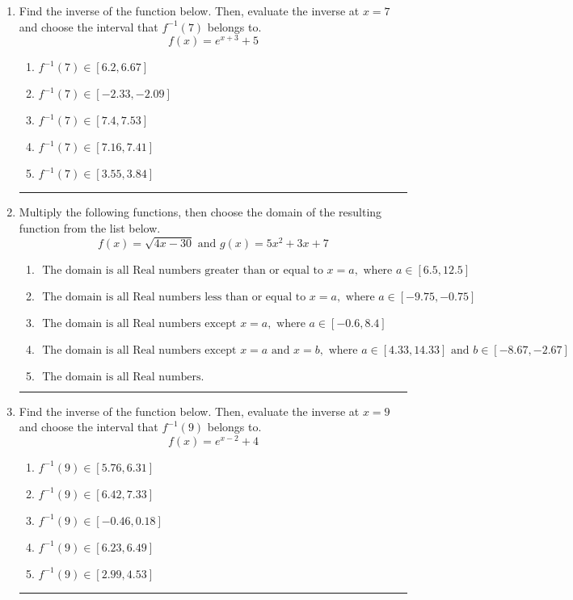 \documentclass[14pt]{extbook}
\newcommand{\litem}[1]{\item#1\hspace*{-1cm}\rule{\textwidth}{0.4pt}}
\begin{document}
\begin{enumerate}
{\begin{enumerate}[label=\Alph*.]
\end{enumerate} }
\litem{
Find the inverse of the function below. Then, evaluate the inverse at $x = 7$ and choose the interval that $f^{-1}(7)$ belongs to.\[ f(x) = e^{x+3}+5 \]\begin{enumerate}[label=\Alph*.]
\item \( f^{-1}(7) \in [6.2, 6.67] \)
\item \( f^{-1}(7) \in [-2.33, -2.09] \)
\item \( f^{-1}(7) \in [7.4, 7.53] \)
\item \( f^{-1}(7) \in [7.16, 7.41] \)
\item \( f^{-1}(7) \in [3.55, 3.84] \)

\end{enumerate} }
\litem{
Multiply the following functions, then choose the domain of the resulting function from the list below.\[ f(x) = \sqrt{4x-30}  \text{ and } g(x) = 5x^{2} +3 x + 7 \]\begin{enumerate}[label=\Alph*.]
\item \( \text{ The domain is all Real numbers greater than or equal to } x = a, \text{ where } a \in [6.5, 12.5] \)
\item \( \text{ The domain is all Real numbers less than or equal to } x = a, \text{ where } a \in [-9.75, -0.75] \)
\item \( \text{ The domain is all Real numbers except } x = a, \text{ where } a \in [-0.6, 8.4] \)
\item \( \text{ The domain is all Real numbers except } x = a \text{ and } x = b, \text{ where } a \in [4.33, 14.33] \text{ and } b \in [-8.67, -2.67] \)
\item \( \text{ The domain is all Real numbers. } \)

\end{enumerate} }
\litem{
Find the inverse of the function below. Then, evaluate the inverse at $x = 9$ and choose the interval that $f^{-1}(9)$ belongs to.\[ f(x) = e^{x-2}+4 \]\begin{enumerate}[label=\Alph*.]
\item \( f^{-1}(9) \in [5.76, 6.31] \)
\item \( f^{-1}(9) \in [6.42, 7.33] \)
\item \( f^{-1}(9) \in [-0.46, 0.18] \)
\item \( f^{-1}(9) \in [6.23, 6.49] \)
\item \( f^{-1}(9) \in [2.99, 4.53] \)

\end{enumerate} }
\end{enumerate}
\end{document}
